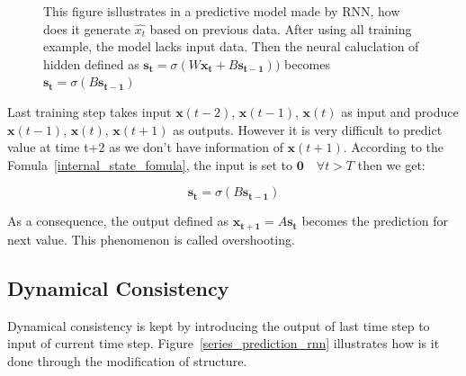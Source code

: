 \documentclass[officiallayout]{tktla}
\begin{document}
\begin{figure}[h!]
\begin{tikzpicture}[>=latex,text height=1.5ex,text depth=0.25ex]

\end{tikzpicture}
  \caption{This figure isllustrates in a predictive model made by RNN, how does it generate $\hat{x_t}$ based on previous data. After using all training example, the model lacks input data. Then the neural caluclation of hidden defined as $\mathbf{s_{t}} = \sigma(W\mathbf{x_t} + B\mathbf{s_{t-1}}))$ becomes $\mathbf{s_{t}} = \sigma(B\mathbf{s_{t-1}})$}\label{overshot_rnn}
\end{figure}

Last training step takes input $\mathbf{x}(t-2)$, $\mathbf{x}(t-1)$, $\mathbf{x}(t)$ as input and produce $\mathbf{x}(t-1)$, $\mathbf{x}(t)$, $\mathbf{x}(t+1)$ as outputs. However it is very difficult to predict value at time t+2 as we don't have information of $\mathbf{x}(t+1)$. According to the Fomula~\ref{internal_state_fomula}, the input is set to $\mathbf{0}\quad \forall t > T$ then we get:

\begin{equation}
\mathbf{s_{t}} = \sigma(B\mathbf{s_{t-1}})\label{overshot_formula}
\end{equation}

As a consequence, the output defined as $\mathbf{x_{t+1}} = A\mathbf{s_{t}}$ becomes the prediction for next value. This phenomenon is called overshooting.
\subsection{Dynamical Consistency}

Dynamical consistency is kept by introducing the output of last time step to input of current time step. Figure~\ref{series_prediction_rnn} illustrates how is it done through the modification of structure.
\end{document}
